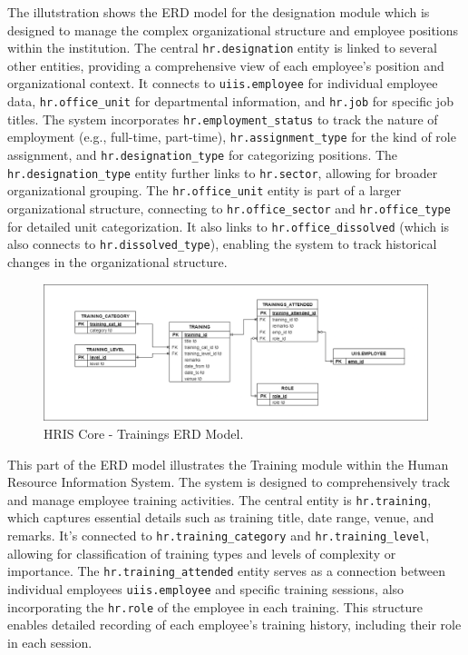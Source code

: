     The illutstration shows the ERD model for the designation module which is designed to manage the complex organizational structure and employee positions within the institution. The central \texttt{hr.designation} entity is linked to several other entities, providing a comprehensive view of each employee's position and organizational context. It connects to \texttt{uiis.employee} for individual employee data, \texttt{hr.office\_unit} for departmental information, and \texttt{hr.job} for specific job titles. The system incorporates \texttt{hr.employment\_status} to track the nature of employment (e.g., full-time, part-time), \texttt{hr.assignment\_type} for the kind of role assignment, and \texttt{hr.designation\_type} for categorizing positions. The \texttt{hr.designation\_type} entity further links to \texttt{hr.sector}, allowing for broader organizational grouping. The \texttt{hr.office\_unit} entity is part of a larger organizational structure, connecting to \texttt{hr.office\_sector} and \texttt{hr.office\_type} for detailed unit categorization. It also links to \texttt{hr.office\_dissolved} (which is also connects to \texttt{hr.dissolved\_type}), enabling the system to track historical changes in the organizational structure.

    \begin{figure}[H]
        \centering
        \includegraphics[width=1\linewidth]{figures/images/diagrams/erd/erd-core-trainings.png}
        \caption{HRIS Core - Trainings ERD Model.}
        \label{fig:erd-core-trainings}
    \end{figure}

    This part of the ERD model illustrates the Training module within the Human Resource Information System. The system is designed to comprehensively track and manage employee training activities. The central entity is \texttt{hr.training}, which captures essential details such as training title, date range, venue, and remarks. It's connected to \texttt{hr.training\_category} and \texttt{hr.training\_level}, allowing for classification of training types and levels of complexity or importance. The \texttt{hr.training\_attended} entity serves as a connection between individual employees \texttt{uiis.employee} and specific training sessions, also incorporating the \texttt{hr.role} of the employee in each training. This structure enables detailed recording of each employee's training history, including their role in each session.

